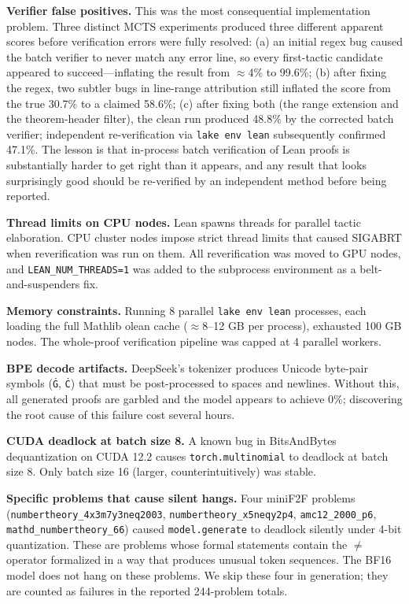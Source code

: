 \documentclass[openany, amssymb, psamsfonts]{amsart}
\theoremstyle{definition}
\numberwithin{equation}{section}
\begin{document}
\textbf{Verifier false positives.}
This was the most consequential implementation problem.
Three distinct MCTS experiments produced three different apparent scores
before verification errors were fully resolved:
(a) an initial regex bug caused the batch verifier to never match any
error line, so every first-tactic candidate appeared to succeed---inflating
the result from $\approx$4\% to 99.6\%;
(b) after fixing the regex, two subtler bugs in line-range attribution
still inflated the score from the true 30.7\% to a claimed 58.6\%;
(c) after fixing both (the range extension and the theorem-header filter),
the clean run produced 48.8\% by the corrected batch verifier; independent
re-verification via \texttt{lake env lean} subsequently confirmed 47.1\%.
The lesson is that in-process batch verification of Lean proofs is
substantially harder to get right than it appears, and any result that
looks surprisingly good should be re-verified by an independent method
before being reported.

\textbf{Thread limits on CPU nodes.}
Lean spawns threads for parallel tactic elaboration.
CPU cluster nodes impose strict thread limits that caused SIGABRT
when reverification was run on them.
All reverification was moved to GPU nodes, and
\texttt{LEAN\_NUM\_THREADS=1} was added to the subprocess environment
as a belt-and-suspenders fix.

\textbf{Memory constraints.}
Running 8 parallel \texttt{lake env lean} processes, each loading the
full Mathlib olean cache (${\approx}8$--12 GB per process), exhausted
100 GB nodes.
The whole-proof verification pipeline was capped at 4 parallel workers.

\textbf{BPE decode artifacts.}
DeepSeek's tokenizer produces Unicode byte-pair symbols (\texttt{Ġ},
\texttt{Ċ}) that must be post-processed to spaces and newlines.
Without this, all generated proofs are garbled and the model appears to
achieve 0\%; discovering the root cause of this failure cost several hours.

\textbf{CUDA deadlock at batch size 8.}
A known bug in BitsAndBytes dequantization on CUDA 12.2 causes
\texttt{torch.multinomial} to deadlock at batch size 8.
Only batch size 16 (larger, counterintuitively) was stable.

\textbf{Specific problems that cause silent hangs.}
Four miniF2F problems (\texttt{numbertheory\_4x3m7y3neq2003},
\texttt{numbertheory\_x5neqy2p4}, \texttt{amc12\_2000\_p6},
\texttt{mathd\_numbertheory\_66}) caused \texttt{model.generate} to
deadlock silently under 4-bit quantization.
These are problems whose formal statements contain the $\neq$ operator
formalized in a way that produces unusual token sequences.
The BF16 model does not hang on these problems.
We skip these four in generation; they are counted as failures in the
reported 244-problem totals.
\end{document}
